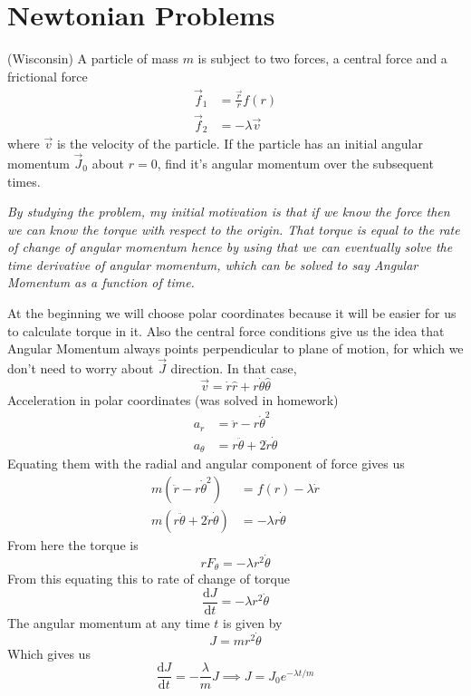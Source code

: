 \documentclass[10pt]{article}
\begin{document}
\newpage
\part{Newtonian Problems}
\begin{prob} \textsf{(Wisconsin)}
	A particle of mass $m$ is subject to two forces, a central force and a frictional force
	\begin{align*}
		\vec{f}_1 &= \frac{\vec{r}}{r} f(r) \\ 
\vec{f}_2 &= - \lambda \vec{v} 
	\end{align*}
	where $\vec{v}$ is the velocity of the particle. If the particle has an initial angular momentum $\vec{J}_0$ about $r = 0$, find it's angular momentum over the subsequent times.
\end{prob}
\begin{solu}
	\emph{By studying the problem, my initial motivation is that if we know the force then we can know the torque with respect to the origin. That torque is equal to the rate of change of angular momentum hence by using that we can eventually solve the time derivative of angular momentum, which can be solved to say Angular Momentum as a function of time.}

	At the beginning we will choose polar coordinates because it will be easier for us to calculate torque in it. Also the central force conditions give us the idea that Angular Momentum always points perpendicular to plane of motion, for which we don't need to worry about $\vec{J}$ direction. In that case,
	\[
	\vec{v} = \dot{r} \hat{r} + r \dot{\theta} \hat{\theta}
	\] 
	Acceleration in polar coordinates (was solved in homework)
	\begin{align*}
		a_r &= \ddot{r} - r \dot{\theta}^2  \\ 
		a_\theta &=  r \ddot{\theta} + 2 \dot{r} \dot{\theta} 
	\end{align*}
	Equating them with the radial and angular component of force gives us
	\begin{align*}
		m \left( \ddot{r} - r \dot{\theta}^2 \right) &= f(r) - \lambda \dot{r} \\ 
		m \left( r \ddot{\theta} + 2 \dot{r} \dot{\theta}  \right) &= - \lambda r \dot{\theta}  
	\end{align*}
	From here the torque is 
	\[
	r F_\theta	 = - \lambda r^2 \dot{\theta}  
	\]
	From this equating this to rate of change of torque 
	\[
	\frac{\mathrm{d} J}{\mathrm{d} t} = - \lambda r^2 \dot{\theta}
	\]
	The angular momentum at any time $t$ is given by 
	\[
	J = m r^2 \dot{\theta}
	\]
	Which gives us 
	\[
	\frac{\mathrm{d} J}{\mathrm{d} t} = - \frac{\lambda}{m} J  \implies J = J_0 e^{- \lambda t / m }
	\]
\end{solu}
\end{document}
